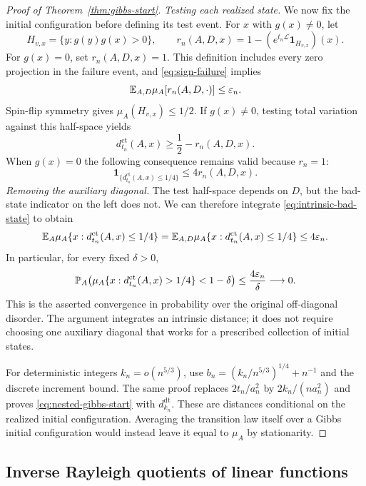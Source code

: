 \begin{proof}[Proof of Theorem~\ref{thm:gibbs-start}]
\smallskip\noindent\emph{Testing each realized state.}
We now fix the initial configuration before defining its test event.
For $x$ with $g(x)\ne0$, let
\[
 H_{v,x}=\{y:g(y)g(x)>0\},\qquad
 r_n(A,D,x)=1-(e^{t_n\mathcal L}\mathbf1_{H_{v,x}})(x).
\]
For $g(x)=0$, set $r_n(A,D,x)=1$.  This definition includes every zero
projection in the failure event, and \eqref{eq:sign-failure} implies
\[
 \mathbb E_{A,D}\mu_A[r_n(A,D,\cdot)]\le\varepsilon_n.
\]
Spin-flip symmetry gives $\mu_A(H_{v,x})\le1/2$.  If $g(x)\ne0$,
testing total variation against this half-space yields
\[
 d_{t_n}^{\mathrm{ct}}(A,x)\ge\frac12-r_n(A,D,x).
\]
When $g(x)=0$ the following consequence remains valid because $r_n=1$:
\begin{equation}\label{eq:intrinsic-bad-state}
 \mathbf1_{\{d_{t_n}^{\mathrm{ct}}(A,x)\le1/4\}}
 \le4r_n(A,D,x).
\end{equation}
\smallskip\noindent\emph{Removing the auxiliary diagonal.}
The test half-space depends on $D$, but the bad-state indicator on the
left does not. We can therefore integrate \eqref{eq:intrinsic-bad-state}
to obtain
\[
 \mathbb E_A\mu_A\{x:d_{t_n}^{\mathrm{ct}}(A,x)\le1/4\}
 =\mathbb E_{A,D}\mu_A\{x:d_{t_n}^{\mathrm{ct}}(A,x)\le1/4\}
 \le4\varepsilon_n.
\]
In particular, for every fixed $\delta>0$,
\begin{equation}\label{eq:nested-gibbs-start}
 \mathbb P_A\!\left(
   \mu_A\{x:d_{t_n}^{\mathrm{ct}}(A,x)>1/4\}<1-\delta
 \right)
 \le\frac{4\varepsilon_n}{\delta}\longrightarrow0.
\end{equation}
This is the asserted convergence in probability over the original
off-diagonal disorder.  The argument integrates an intrinsic distance;
it does not require choosing one auxiliary diagonal that works for a
prescribed collection of initial states.

For deterministic integers $k_n=o(n^{5/3})$, use
$b_n=(k_n/n^{5/3})^{1/4}+n^{-1}$ and the discrete increment bound.
The same proof replaces $2t_n/a_n^2$ by $2k_n/(na_n^2)$ and proves
\eqref{eq:nested-gibbs-start} with $d_{k_n}^{\mathrm{dt}}$.
These are distances conditional on the realized initial configuration.
Averaging the transition law itself over a Gibbs initial configuration
would instead leave it equal to $\mu_A$ by stationarity.
\end{proof}

\subsection{Inverse Rayleigh quotients of linear functions}

